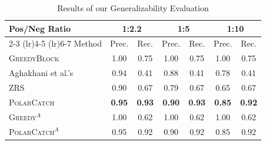 \begin{table}[!t]
  \centering
  \footnotesize
  \caption{Results of our Generalizability Evaluation}
  \vspace{-9pt}
  \begin{tabular}{m{2.6cm}cccccc}
    \toprule
    Pos/Neg Ratio 
      & \multicolumn{2}{c}{1:2.2}
      & \multicolumn{2}{c}{1:5}
      & \multicolumn{2}{c}{1:10} \\
    \cmidrule(lr){2-3}
    \cmidrule(lr){4-5}
    \cmidrule(lr){6-7}
    Method 
      & Prec. & Rec.
      & Prec. & Rec.
      & Prec. & Rec. \\
    \midrule
    \textsc{GreedyBlock} 
      & 1.00 & 0.75 & 1.00 & 0.75 & 1.00 & 0.75 \\
    Aghakhani et al.'s  
      & 0.94 & 0.41 & 0.88 & 0.41 & 0.78 & 0.41 \\
    \textsc{ZRS}    
      & 0.90 & 0.67 & 0.79 & 0.67 & 0.65 & 0.67 \\
    \textsc{PolarCatch}  
      & \textbf{0.95} & \textbf{0.93}
      & \textbf{0.90} & \textbf{0.93}
      & \textbf{0.85} & \textbf{0.92} \\
    \midrule
    \textsc{Greedy}$^A$  
      & 1.00 & 0.62 & 1.00 & 0.62 & 1.00 & 0.62 \\
    \textsc{PolarCatch}$^A$ 
      & 0.95 & 0.92 & 0.90 & 0.92 & 0.85 & 0.92 \\
    \bottomrule
  \end{tabular}
  \label{tab:rq_generalizability}
\end{table}



